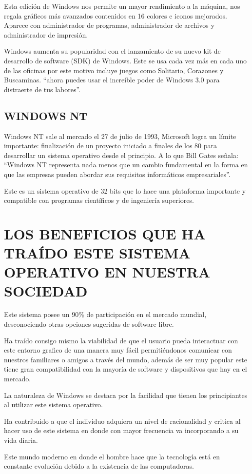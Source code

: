 Esta edición de Windows nos permite un mayor rendimiento a la máquina, nos regala gráficos más avanzados contenidos en 16 colores e iconos mejorados. Aparece con 
administrador de programas, administrador de archivos y administrador de impresión.
 
Windows aumenta su popularidad con el lanzamiento de su nuevo kit de desarrollo de software (SDK) de Windows. Este se usa cada vez más en cada uno de las oficinas por este 
motivo incluye juegos como Solitario, Corazones y Buscaminas. “ahora puedes usar el increíble poder de Windows 3.0 para distraerte de tus labores”.

\subsection*{WINDOWS NT}
Windows NT sale al mercado el 27 de julio de 1993, Microsoft logra un límite importante: finalización de un proyecto iniciado a finales de los 80 para desarrollar un 
sistema operativo desde el principio. A lo que Bill Gates señala: “Windows NT representa nada menos que un cambio fundamental en la forma en que las empresas pueden abordar 
sus requisitos informáticos empresariales”.
 
Este es un sistema operativo de 32 bits que lo hace una plataforma importante y compatible con programas científicos y de ingeniería superiores.

\section*{LOS BENEFICIOS QUE HA TRAÍDO ESTE SISTEMA OPERATIVO EN NUESTRA SOCIEDAD}
Este sistema posee un 90\% de participación en el mercado mundial, desconociendo otras opciones sugeridas de software libre.

Ha traído consigo mismo la viabilidad de que el  usuario pueda interactuar con este entorno grafico de una manera muy fácil  permitiéndonos comunicar con nuestros 
familiares o amigos a través del mundo, además de ser muy popular este tiene gran compatibilidad con la mayoría de  software y dispositivos que hay en el mercado.

La naturaleza de Windows  se destaca por la facilidad que tienen los principiantes al utilizar este sistema operativo.

Ha contribuido a que el individuo adquiera un nivel de racionalidad y critica al hacer uso de este sistema en donde con mayor frecuencia va incorporando a su vida diaria.

Este mundo moderno en donde el hombre hace que la tecnología está en constante evolución debido a la existencia de las computadoras.

